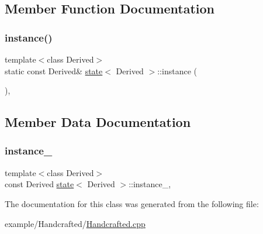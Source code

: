 \subsection{Member Function Documentation}
\mbox{\label{classstate_a7b37e640afb7489d85967b298968e1c0}} 
\subsubsection{\texorpdfstring{instance()}{instance()}}
{\footnotesize\ttfamily template$<$class Derived$>$ \\
static const Derived\& \mbox{\hyperlink{classstate}{state}}$<$ Derived $>$\+::instance (\begin{DoxyParamCaption}{ }\end{DoxyParamCaption})\hspace{0.3cm}{\ttfamily [inline]}, {\ttfamily [static]}}



\subsection{Member Data Documentation}
\mbox{\label{classstate_adb98499390fbf548da556d9eaa7272fd}} 
\subsubsection{\texorpdfstring{instance\+\_\+}{instance\_}}
{\footnotesize\ttfamily template$<$class Derived$>$ \\
const Derived \mbox{\hyperlink{classstate}{state}}$<$ Derived $>$\+::instance\+\_\+\hspace{0.3cm}{\ttfamily [static]}, {\ttfamily [private]}}



The documentation for this class was generated from the following file\+:\begin{DoxyCompactItemize}
\item 
example/\+Handcrafted/\mbox{\hyperlink{_handcrafted_8cpp}{Handcrafted.\+cpp}}\end{DoxyCompactItemize}
